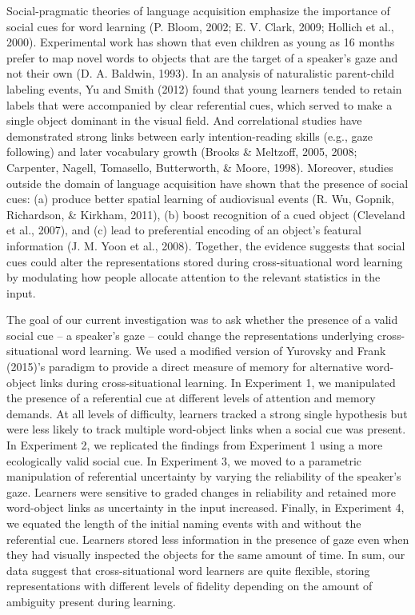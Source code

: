 \documentclass[oneside]{report}
\begin{document}
Social-pragmatic theories of language acquisition emphasize the
importance of social cues for word learning (P. Bloom, 2002; E. V.
Clark, 2009; Hollich et al., 2000). Experimental work has shown that
even children as young as 16 months prefer to map novel words to objects
that are the target of a speaker's gaze and not their own (D. A.
Baldwin, 1993). In an analysis of naturalistic parent-child labeling
events, Yu and Smith (2012) found that young learners tended to retain
labels that were accompanied by clear referential cues, which served to
make a single object dominant in the visual field. And correlational
studies have demonstrated strong links between early intention-reading
skills (e.g., gaze following) and later vocabulary growth (Brooks \&
Meltzoff, 2005, 2008; Carpenter, Nagell, Tomasello, Butterworth, \&
Moore, 1998). Moreover, studies outside the domain of language
acquisition have shown that the presence of social cues: (a) produce
better spatial learning of audiovisual events (R. Wu, Gopnik,
Richardson, \& Kirkham, 2011), (b) boost recognition of a cued object
(Cleveland et al., 2007), and (c) lead to preferential encoding of an
object's featural information (J. M. Yoon et al., 2008). Together, the
evidence suggests that social cues could alter the representations
stored during cross-situational word learning by modulating how people
allocate attention to the relevant statistics in the input.

The goal of our current investigation was to ask whether the presence of
a valid social cue -- a speaker's gaze -- could change the
representations underlying cross-situational word learning. We used a
modified version of Yurovsky and Frank (2015)'s paradigm to provide a
direct measure of memory for alternative word-object links during
cross-situational learning. In Experiment 1, we manipulated the presence
of a referential cue at different levels of attention and memory
demands. At all levels of difficulty, learners tracked a strong single
hypothesis but were less likely to track multiple word-object links when
a social cue was present. In Experiment 2, we replicated the findings
from Experiment 1 using a more ecologically valid social cue. In
Experiment 3, we moved to a parametric manipulation of referential
uncertainty by varying the reliability of the speaker's gaze. Learners
were sensitive to graded changes in reliability and retained more
word-object links as uncertainty in the input increased. Finally, in
Experiment 4, we equated the length of the initial naming events with
and without the referential cue. Learners stored less information in the
presence of gaze even when they had visually inspected the objects for
the same amount of time. In sum, our data suggest that cross-situational
word learners are quite flexible, storing representations with different
levels of fidelity depending on the amount of ambiguity present during
learning.
\end{document}
